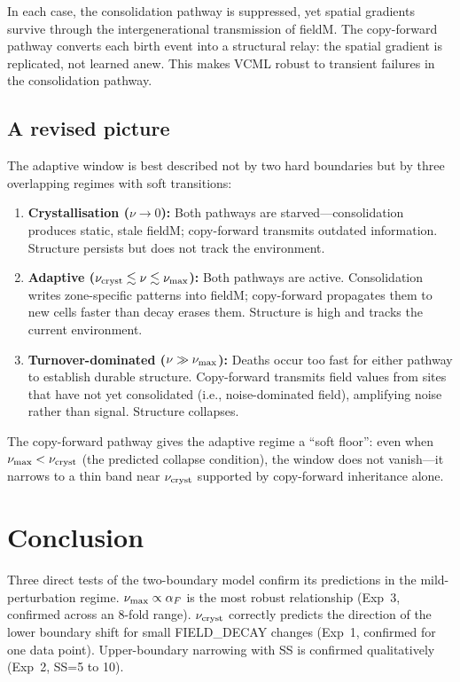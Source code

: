 \documentclass[11pt]{article}
\begin{document}
In each case, the consolidation pathway is suppressed, yet spatial gradients survive
through the intergenerational transmission of fieldM.
The copy-forward pathway converts each birth event into a structural relay: the
spatial gradient is replicated, not learned anew.
This makes VCML robust to transient failures in the consolidation pathway.

\subsection{A revised picture}

The adaptive window is best described not by two hard boundaries but by three overlapping
regimes with soft transitions:
\begin{enumerate}
  \item \textbf{Crystallisation ($\nu \to 0$):}
    Both pathways are starved---consolidation produces static, stale fieldM;
    copy-forward transmits outdated information.
    Structure persists but does not track the environment.
  \item \textbf{Adaptive ($\nu_{\rm cryst} \lesssim \nu \lesssim \nu_{\rm max}$):}
    Both pathways are active.
    Consolidation writes zone-specific patterns into fieldM; copy-forward
    propagates them to new cells faster than decay erases them.
    Structure is high and tracks the current environment.
  \item \textbf{Turnover-dominated ($\nu \gg \nu_{\rm max}$):}
    Deaths occur too fast for either pathway to establish durable structure.
    Copy-forward transmits field values from sites that have not yet consolidated
    (i.e., noise-dominated field), amplifying noise rather than signal.
    Structure collapses.
\end{enumerate}

The copy-forward pathway gives the adaptive regime a ``soft floor'': even when
$\nu_{\rm max} < \nu_{\rm cryst}$ (the predicted collapse condition), the window
does not vanish---it narrows to a thin band near $\nu_{\rm cryst}$ supported by
copy-forward inheritance alone.

\section{Conclusion}

Three direct tests of the two-boundary model confirm its predictions in the
mild-perturbation regime.
$\nu_{\rm max} \propto \alpha_F$ is the most robust relationship (Exp~3, confirmed
across an 8-fold range).
$\nu_{\rm cryst}$ correctly predicts the direction of the lower boundary shift
for small FIELD\_DECAY changes (Exp~1, confirmed for one data point).
Upper-boundary narrowing with SS is confirmed qualitatively (Exp~2, SS=5 to 10).
\end{document}
